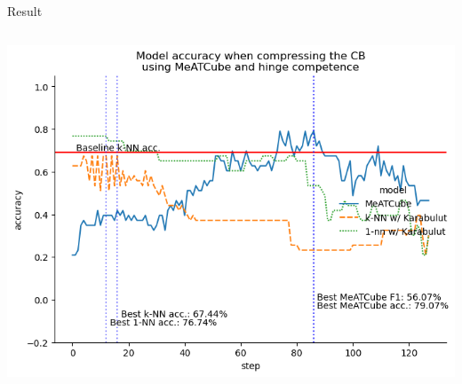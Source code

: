 \documentclass[]{beamer}
\begin{document}
\begin{frame}{Result}
\begin{columns}
\begin{column}{.65\textwidth}
            \includegraphics[width=.8\textwidth]{../results-weight-estim+/figs/glass+identification.png}
        \end{column}
    \end{columns}
\end{frame}
\end{document}
